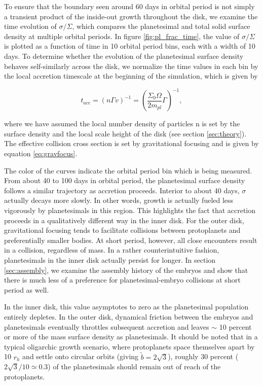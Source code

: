 \documentclass[twocolumn,linenumbers]{aastex63}
\begin{document}
To ensure that the boundary seen around 60 days in orbital period is not
simply a transient product of the inside-out growth throughout the
disk, we examine the time evolution of $\sigma/\Sigma$, which compares the planetesimal and total solid surface density at 
multiple orbital periods. In figure \ref{fig:pl_frac_time}, the value of
$\sigma/\Sigma$ is plotted as a function of time in 10 orbital period
bins, each with a width of 10 days. To determine whether the evolution of the planetesimal surface density behaves self-similarly across the disk,
we normalize the time values in each bin by the local accretion timescale at the beginning of the simulation, which is given by

\begin{equation}\label{eq:acctime}
	t_{acc} = \left( n \Gamma v \right)^{-1} = \left( \frac{\Sigma_{0} \Omega}{2 m_{pl}} \Gamma \right)^{-1},
\end{equation}

\noindent where we have assumed the local number density of particles n is set by the surface density and the local scale height of the disk (see section \ref{sec:theory}). The effective collision cross section is set by gravitational focusing and is given by equation \ref{eq:gravfocus}.

The color of the curves indicate the orbital period bin which is being measured. From about 40 to 100 days in orbital period, the planetesimal surface 
density follows a similar trajectory as accretion proceeds. Interior to about 40 days, $\sigma$ actually decays more slowly. In other words, growth is actually 
fueled less vigorously by planetesimals in this region. This highlights the fact that accretion proceeds in a qualitatively different way in the inner disk. For the 
outer disk, gravitational focusing tends to facilitate collisions between protoplanets and preferentially smaller bodies. At short period, however, all close 
encounters result in a collision, regardless of mass. In a rather counterintuitive fashion, planetesimals in the inner disk actually persist for longer. In section 
\ref{sec:assembly}, we examine the assembly history of the embryos and show that there is much less of a preference for planetesimal-embryo collisions at 
short period as well.

In the inner disk, this value asymptotes to zero as the 
planetesimal population entirely depletes. In the outer disk, dynamical friction between the embryos and planetesimals 
eventually throttles subsequent accretion and leaves $\sim$ 10 percent or more of the mass surface density as planetesimals. It 
should be noted that in a typical oligarchic growth scenario, where protoplanets space themselves apart by 10 $r_{h}$ and settle 
onto circular orbits (giving $\tilde{b} = 2 \sqrt{3}$), roughly 30 percent ($2\sqrt{3}/10 \simeq 0.3$) of the planetesimals
should remain out of reach of the protoplanets.
\end{document}
